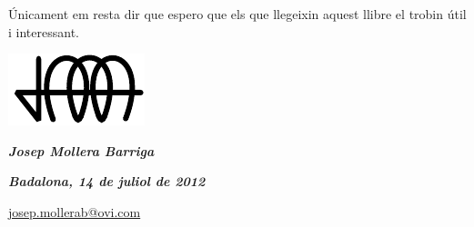    \'{U}nicament em resta dir que espero que els que llegeixin aquest llibre el trobin
   \'{u}til i interessant.

\vspace*{1cm}
\hfill
\begin{minipage}[b]{25mm}
    \includegraphics{Imatges/Pre-Prefaci-JMB.pdf}
\end{minipage}

{\large

\hfill \textbf{\textsl{Josep Mollera Barriga}}

\hfill \textbf{\textsl{Badalona, 14 de juliol de 2012}}

\hfill \href{mailto:jmollerab@ya.com}{\Letter\hspace{2mm}josep.mollerab@ovi.com}

}
